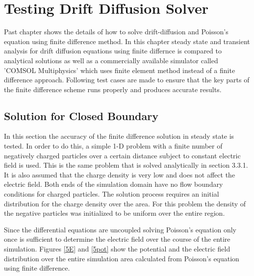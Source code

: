 
\chapter{Testing Drift Diffusion Solver} %

\label{Chapter4} %


\begin{doublespace}

Past chapter shows the details of how to solve drift-diffusion and Poisson's equation using finite difference method. In this chapter steady state and transient analysis for drift diffusion equations using finite differnce is compared to analytical solutions as well as a commercially available simulator called 'COMSOL Multiphysics' which uses finite element method instead of a finite difference approach. Following test cases are made to ensure that the key parts of the finite difference scheme runs properly and produces accurate results. 

\section{Solution for Closed Boundary}
In this section the accuracy of the finite difference solution in steady state is tested. In order to do this, a simple 1-D problem with a finite number of negatively charged particles over a certain distance subject to constant electric field is used. This is the same problem that is solved analytically in section 3.3.1. It is also assumed that the charge density is very low and does not affect the electric field. Both ends of the simulation domain have no flow boundary conditions for charged particles. The solution process requires an initial distribution for the charge density over the area. For this problem the density of the negative particles was initialized to be uniform over the entire region. 

Since the differential equations are uncoupled solving Poisson's equation only once is sufficient to determine the electric field over the course of the entire simulation. Figures \ref{5E} and \ref{5pot} show the potential and the electric field distribution over the entire simulation area calculated from Poisson's equation using finite difference. 


\end{doublespace}
